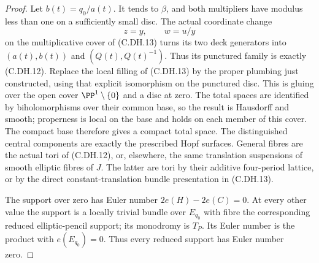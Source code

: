 \begin{proof}
Let $b(t)=q_0/a(t)$.
It tends to $\beta$,
and both multipliers
have modulus less than
one on a sufficiently
small disc. The actual
coordinate change
\[
                        z=y,\qquad w=u/y
                                                               \tag{C.DH.15}
\]
on the multiplicative
cover of (C.DH.13)
turns its two deck
generators into
$(a(t),b(t))$ and
$(Q(t),Q(t)^{-1})$.
Thus its punctured
family is exactly
(C.DH.12). Replace
the local filling
of (C.DH.13) by
the proper plumbing
just constructed,
using that explicit
isomorphism on the
punctured disc.
This is gluing over
the open cover
$\PP^1\setminus\{0\}$
and a disc at zero.
The total spaces
are identified by
biholomorphisms over
their common base,
so the result is
Hausdorff and smooth;
properness is local
on the base and
holds on each member
of this cover.
The compact base
therefore gives a
compact total space.
The distinguished
central components
are exactly the
prescribed Hopf
surfaces. General
fibres are the
actual tori of
(C.DH.12), or,
elsewhere, the same
translation suspensions
of smooth elliptic
fibres of $J$.
The latter are tori
by their additive
four-period lattice,
or by the direct
constant-translation
bundle presentation
in (C.DH.13).

The support over zero
has Euler number
$2e(H)-2e(C)=0$.
At every other value
the support is a
locally trivial bundle
over $E_{q_0}$ with
fibre the corresponding
reduced elliptic-pencil
support; its monodromy
is $T_P$. Its Euler
number is the product
with $e(E_{q_0})=0$.
Thus every reduced
support has Euler
number zero.


\end{proof}
